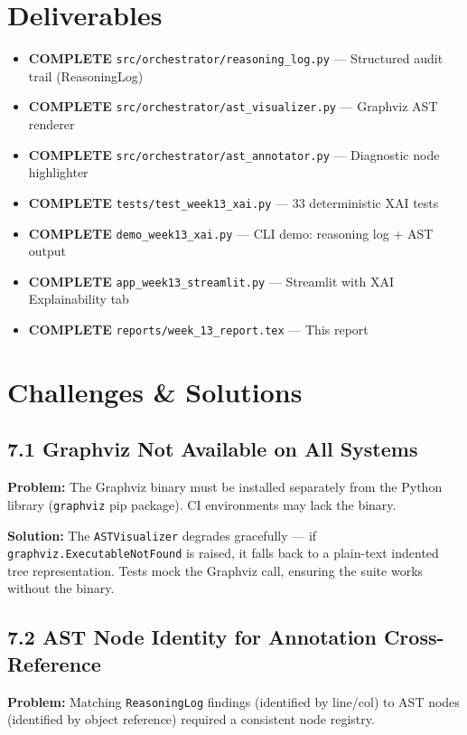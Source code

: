 \documentclass[a4paper,11pt]{article}
\newcommand{\statusgood}[1]{\colorbox{green!20}{\textbf{#1}}}
\begin{document}
\section{Deliverables}

\begin{itemize}[leftmargin=*]
    \item \statusgood{COMPLETE} \texttt{src/orchestrator/reasoning\_log.py} --- Structured audit trail (ReasoningLog)
    \item \statusgood{COMPLETE} \texttt{src/orchestrator/ast\_visualizer.py} --- Graphviz AST renderer
    \item \statusgood{COMPLETE} \texttt{src/orchestrator/ast\_annotator.py} --- Diagnostic node highlighter
    \item \statusgood{COMPLETE} \texttt{tests/test\_week13\_xai.py} --- 33 deterministic XAI tests
    \item \statusgood{COMPLETE} \texttt{demo\_week13\_xai.py} --- CLI demo: reasoning log + AST output
    \item \statusgood{COMPLETE} \texttt{app\_week13\_streamlit.py} --- Streamlit with XAI Explainability tab
    \item \statusgood{COMPLETE} \texttt{reports/week\_13\_report.tex} --- This report
\end{itemize}

\section{Challenges \& Solutions}

\subsection{7.1 Graphviz Not Available on All Systems}
\textbf{Problem:} The Graphviz binary must be installed separately from the Python library (\texttt{graphviz} pip package). CI environments may lack the binary.

\textbf{Solution:} The \texttt{ASTVisualizer} degrades gracefully --- if \texttt{graphviz.ExecutableNotFound} is raised, it falls back to a plain-text indented tree representation. Tests mock the Graphviz call, ensuring the suite works without the binary.

\subsection{7.2 AST Node Identity for Annotation Cross-Reference}
\textbf{Problem:} Matching \texttt{ReasoningLog} findings (identified by line/col) to AST nodes (identified by object reference) required a consistent node registry.
\end{document}
